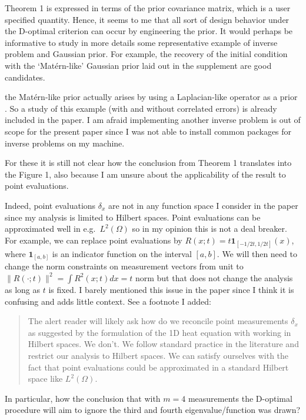   
\RC Theorem 1 is expressed in terms of the prior covariance matrix,
which is a user specified quantity. Hence, it seems to me that all
sort of design behavior under the D-optimal criterion can occur by
engineering the prior. It would perhaps be informative to study in
more details some representative example of inverse problem and
Gaussian prior. For example, the recovery of the initial condition
with the ‘Mat\'ern-like’ Gaussian prior laid out in the supplement are
good candidates.

\AR the Mat\'ern-like prior actually arises by using a Laplacian-like
operator as a prior \cite{rue2011}. So a study of this example (with
and without correlated errors) is already included in the paper. I am
afraid implementing another inverse problem is out of scope for the
present paper since I was not able to install common packages for
inverse problems \cite{attia2023pyoed, villa2021} on my machine.
  
\RC For these it is still not clear how the conclusion from Theorem 1
translates into the Figure 1, also because I am unsure about the
applicability of the result to point evaluations.

\AR Indeed, point evaluations $\delta_x$ are not in any function space
I consider in the paper since my analysis is limited to Hilbert
spaces. Point evaluations can be approximated well in
e.g.~$L^2(\Omega)$ so in my opinion this is not a deal breaker. For
example, we can replace point evaluations by $R(x;t) =
t\mathbf{1}_{[-1/2t, 1/2t]}(x)$, where $\mathbf{1}_{[a,b]}$ is an
indicator function on the interval $[a,b]$. We will then need to
change the norm constraints on measurement vectors from unit to
$\|R(\cdot;t)\|^2 = \int R^2(x;t)dx = t$ norm but that does not change
the analysis as long as $t$ is fixed. I barely mentioned this issue in
the paper since I think it is confusing and adds little context. See a
footnote I added:

\begin{quote} %
  The alert reader will likely ask how do we reconcile point
  measurements $\delta_x$ as suggested by the formulation of the 1D
  heat equation with working in Hilbert spaces. We don't. We follow
  standard practice in the literature and restrict our analysis to
  Hilbert spaces. We can satisfy ourselves with the fact that point
  evaluations could be approximated in a standard Hilbert space like
  $L^2(\Omega)$.
\end{quote}
  
\RC In particular, how the conclusion that with $m = 4$ measurements
the D-optimal procedure will aim to ignore the third and fourth
eigenvalue/function was drawn?

